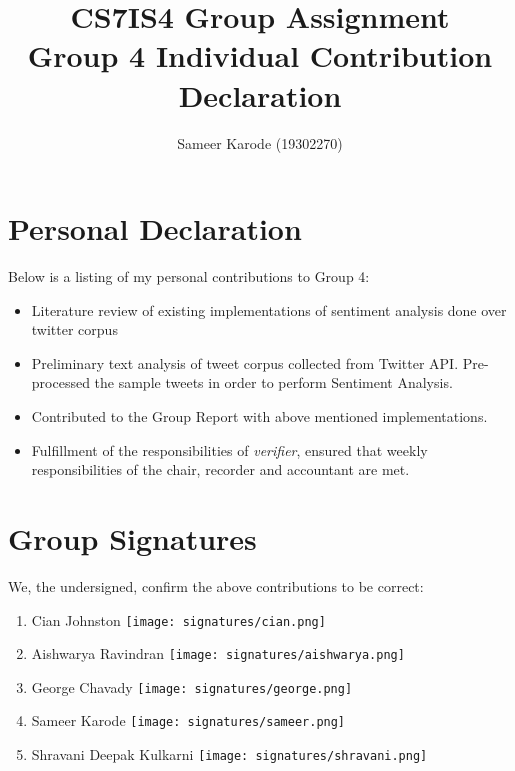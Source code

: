 \documentclass[a4paper,10pt]{article}
\begin{document}
\title{
    CS7IS4 Group Assignment \\
    \large Group 4 Individual Contribution Declaration
}
\author{
    Sameer Karode (19302270)
}

\maketitle

\section{Personal Declaration}

Below is a listing of my personal contributions to Group 4:

\begin{itemize}
    \item {Literature review of existing implementations of sentiment analysis done over twitter corpus}
    \item{
        Preliminary text analysis of tweet corpus collected from Twitter API. Pre-processed the sample tweets in order to perform Sentiment Analysis.
    }
    \item{
       Contributed to the Group Report with above mentioned implementations.
    }
    \item{
        Fulfillment of the responsibilities of \textit{verifier}, ensured that weekly responsibilities of the chair, recorder and accountant are met.
    }
\end{itemize}

\section{Group Signatures}

We, the undersigned, confirm the above contributions to be correct:

\begin{enumerate}
    \item{
        Cian Johnston \texttt{[image: signatures/cian.png]}
    }
    \item{
        Aishwarya Ravindran \texttt{[image: signatures/aishwarya.png]}
    }
    \item{
        George Chavady \texttt{[image: signatures/george.png]}
    }
    \item{
        Sameer Karode \texttt{[image: signatures/sameer.png]}
    }
    \item{
        Shravani Deepak Kulkarni \texttt{[image: signatures/shravani.png]}
    }

\end{enumerate}
\end{document}
